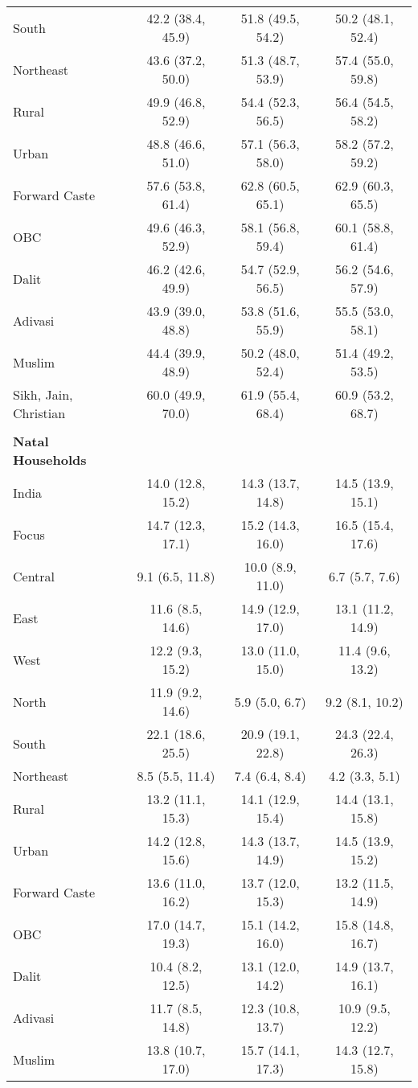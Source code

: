 \begin{tabular}{lccc}
South&42.2 (38.4, 45.9)&51.8 (49.5, 54.2)&50.2 (48.1, 52.4)\\
Northeast&43.6 (37.2, 50.0)&51.3 (48.7, 53.9)&57.4 (55.0, 59.8)\\
Rural&49.9 (46.8, 52.9)&54.4 (52.3, 56.5)&56.4 (54.5, 58.2)\\
Urban&48.8 (46.6, 51.0)&57.1 (56.3, 58.0)&58.2 (57.2, 59.2)\\
Forward Caste&57.6 (53.8, 61.4)&62.8 (60.5, 65.1)&62.9 (60.3, 65.5)\\
OBC&49.6 (46.3, 52.9)&58.1 (56.8, 59.4)&60.1 (58.8, 61.4)\\
Dalit&46.2 (42.6, 49.9)&54.7 (52.9, 56.5)&56.2 (54.6, 57.9)\\
Adivasi&43.9 (39.0, 48.8)&53.8 (51.6, 55.9)&55.5 (53.0, 58.1)\\
Muslim&44.4 (39.9, 48.9)&50.2 (48.0, 52.4)&51.4 (49.2, 53.5)\\
Sikh, Jain, Christian&60.0 (49.9, 70.0)&61.9 (55.4, 68.4)&60.9 (53.2, 68.7)\\
&&&\\
\textbf{Natal Households}&&&\\
India&14.0 (12.8, 15.2)&14.3 (13.7, 14.8)&14.5 (13.9, 15.1)\\
Focus&14.7 (12.3, 17.1)&15.2 (14.3, 16.0)&16.5 (15.4, 17.6)\\
Central&9.1 (6.5, 11.8)&10.0 (8.9, 11.0)&6.7 (5.7, 7.6)\\
East&11.6 (8.5, 14.6)&14.9 (12.9, 17.0)&13.1 (11.2, 14.9)\\
West&12.2 (9.3, 15.2)&13.0 (11.0, 15.0)&11.4 (9.6, 13.2)\\
North&11.9 (9.2, 14.6)&5.9 (5.0, 6.7)&9.2 (8.1, 10.2)\\
South&22.1 (18.6, 25.5)&20.9 (19.1, 22.8)&24.3 (22.4, 26.3)\\
Northeast&8.5 (5.5, 11.4)&7.4 (6.4, 8.4)&4.2 (3.3, 5.1)\\
Rural&13.2 (11.1, 15.3)&14.1 (12.9, 15.4)&14.4 (13.1, 15.8)\\
Urban&14.2 (12.8, 15.6)&14.3 (13.7, 14.9)&14.5 (13.9, 15.2)\\
Forward Caste&13.6 (11.0, 16.2)&13.7 (12.0, 15.3)&13.2 (11.5, 14.9)\\
OBC&17.0 (14.7, 19.3)&15.1 (14.2, 16.0)&15.8 (14.8, 16.7)\\
Dalit&10.4 (8.2, 12.5)&13.1 (12.0, 14.2)&14.9 (13.7, 16.1)\\
Adivasi&11.7 (8.5, 14.8)&12.3 (10.8, 13.7)&10.9 (9.5, 12.2)\\
Muslim&13.8 (10.7, 17.0)&15.7 (14.1, 17.3)&14.3 (12.7, 15.8)\\

\end{tabular}
